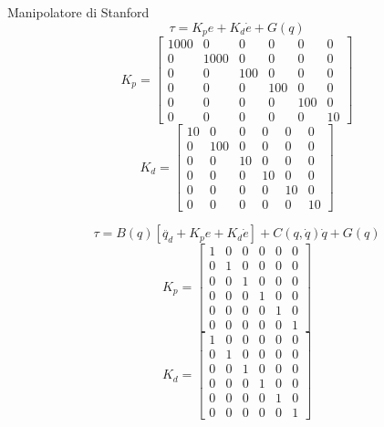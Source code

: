 \documentclass[a4paper]{article}
\begin{document}
Manipolatore di Stanford
\begin{equation}
\tau = K_p e + K_d \dot{e} + G(q)
\end{equation}
\begin{equation}
K_p = 
\begin{bmatrix}
1000 & 0 & 0	& 0 & 0 & 0 \\
0 & 1000 & 0 & 0 & 0 & 0 \\
0 & 0 & 100 & 0 & 0 & 0 \\
0 & 0 & 0 & 100 & 0 & 0 \\
0 & 0 & 0 & 0 & 100 & 0 \\
0 & 0 & 0 & 0 & 0 & 10
\end{bmatrix}
\end{equation}
\begin{equation}
K_d = 
\begin{bmatrix}
10 & 0 & 0	& 0 & 0 & 0 \\
0 & 100 & 0 & 0 & 0 & 0 \\
0 & 0 & 10 & 0 & 0 & 0 \\
0 & 0 & 0 & 10 & 0 & 0 \\
0 & 0 & 0 & 0 & 10 & 0 \\
0 & 0 & 0 & 0 & 0 & 10
\end{bmatrix}
\end{equation}

\begin{equation}
\tau = B(q)[\ddot{q_d} + K_p e + K_d \dot{e}] + C(q,\dot{q})\dot{q} + G(q)
\end{equation}
\begin{equation}
K_p = 
\begin{bmatrix}
1 & 0 & 0	& 0 & 0 & 0 \\
0 & 1 & 0 & 0 & 0 & 0 \\
0 & 0 & 1 & 0 & 0 & 0 \\
0 & 0 & 0 & 1 & 0 & 0 \\
0 & 0 & 0 & 0 & 1 & 0 \\
0 & 0 & 0 & 0 & 0 & 1
\end{bmatrix}
\end{equation}
\begin{equation}
K_d = 
\begin{bmatrix}
1 & 0 & 0	& 0 & 0 & 0 \\
0 & 1 & 0 & 0 & 0 & 0 \\
0 & 0 & 1 & 0 & 0 & 0 \\
0 & 0 & 0 & 1 & 0 & 0 \\
0 & 0 & 0 & 0 & 1 & 0 \\
0 & 0 & 0 & 0 & 0 & 1
\end{bmatrix}
\end{equation}
\end{document}
